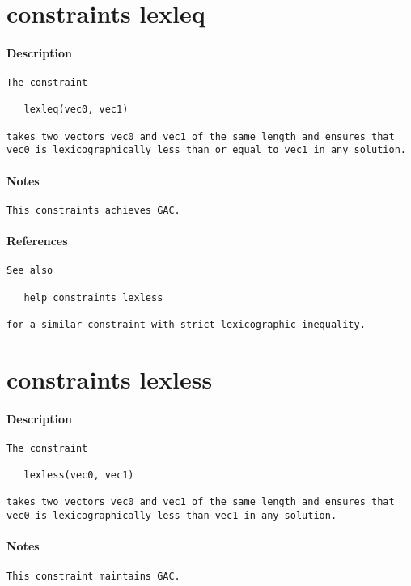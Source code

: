 \section{constraints lexleq}
\paragraph{Description}
{\footnotesize
\begin{verbatim}
The constraint

   lexleq(vec0, vec1)

takes two vectors vec0 and vec1 of the same length and ensures that
vec0 is lexicographically less than or equal to vec1 in any solution.
\end{verbatim}
}
\paragraph{Notes}
{\footnotesize
\begin{verbatim}
This constraints achieves GAC.
\end{verbatim}
}
\paragraph{References}
{\footnotesize
\begin{verbatim}
See also

   help constraints lexless

for a similar constraint with strict lexicographic inequality.
\end{verbatim}
}
\section{constraints lexless}
\paragraph{Description}
{\footnotesize
\begin{verbatim}
The constraint

   lexless(vec0, vec1)

takes two vectors vec0 and vec1 of the same length and ensures that
vec0 is lexicographically less than vec1 in any solution.
\end{verbatim}
}
\paragraph{Notes}
{\footnotesize
\begin{verbatim}
This constraint maintains GAC.
\end{verbatim}
}
